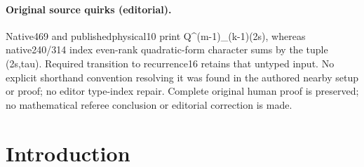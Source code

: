 \documentclass[10pt]{article}
\theoremstyle{definition}
\begin{document}
\paragraph{Original source quirks (editorial).} Native469 and publishedphysical10 print Q\textasciicircum{}(m-1)\_(k-1)(2s), whereas native240/314 index even-rank quadratic-form character sums by the tuple (2s,tau). Required transition to recurrence16 retains that untyped input. No explicit shorthand convention resolving it was found in the authored nearby setup or proof; no editor type-index repair. Complete original human proof is preserved; no mathematical referee conclusion or editorial correction is made.
\clearpage

\section{Introduction}
\end{document}
